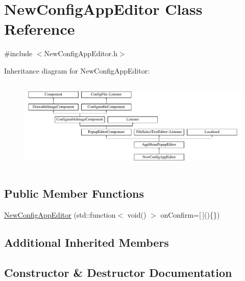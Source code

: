\hypertarget{classNewConfigAppEditor}{}\section{New\+Config\+App\+Editor Class Reference}
\label{classNewConfigAppEditor}


{\ttfamily \#include $<$New\+Config\+App\+Editor.\+h$>$}

Inheritance diagram for New\+Config\+App\+Editor\+:\begin{figure}[H]
\begin{center}
\leavevmode
\includegraphics[height=4.444445cm]{classNewConfigAppEditor}
\end{center}
\end{figure}
\subsection*{Public Member Functions}
\begin{DoxyCompactItemize}
\item 
\mbox{\hyperlink{classNewConfigAppEditor_a5189c5ed6f301a158ef02d74572bf1a2}{New\+Config\+App\+Editor}} (std\+::function$<$ void() $>$ on\+Confirm=\mbox{[}$\,$\mbox{]}()\{\})
\end{DoxyCompactItemize}
\subsection*{Additional Inherited Members}


\subsection{Constructor \& Destructor Documentation}
\mbox{\label{classNewConfigAppEditor_a5189c5ed6f301a158ef02d74572bf1a2}} 
